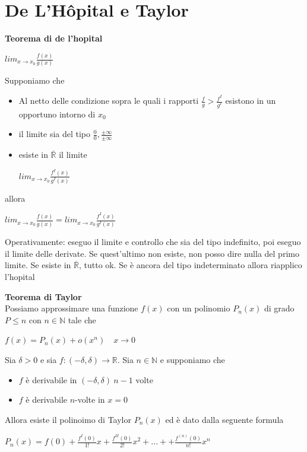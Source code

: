 \documentclass[12pt, a4paper]{article}
\begin{document}
    \section{De L'Hôpital e Taylor}
    \textbf{Teorema di de l'hopital}
    \begin{center}
        $lim_{x\to x_{0}}\frac{f(x)}{g(x)}$
    \end{center}
    Supponiamo che
    \begin{itemize}
        \item Al netto delle condizione sopra le quali i rapporti $\frac{f}{g}>\frac{f^{I}}{g^{I}}$ esistono in un
              opportuno intorno di $x_{0}$
        \item il limite sia del tipo $\frac{0}{0},\frac{\pm\infty}{\pm\infty}$
        \item esiste in $\overline{\mathbb{R}}$ il limite
              \begin{center}
                  $lim_{x\to x_{0}}\frac{f^{I}(x)}{g^{I}(x)}$
              \end{center}
    \end{itemize}
    allora
    \begin{center}
        $lim_{x\to x_{0}}\frac{f(x)}{g(x)}=lim_{x\to x_{0}}\frac{f^{I}(x)}{g^{I}(x)}$
    \end{center}

    Operativamente: eseguo il limite e controllo che sia del tipo indefinito, poi eseguo il limite delle derivate. Se
    quest'ultimo non esiste, non posso dire nulla del primo limite. Se esiste in $\overline{\mathbb{R}}$, tutto ok.
    Se è ancora del tipo indeterminato allora riapplico l'hopital

    \textbf{Teorema di Taylor}\\Possiamo approssimare una funzione $f(x)$ con un polinomio $P_{n}(x)$ di grado $P\leq n$
    con $n\in\mathbb{N}$ tale che
    \begin{center}
        $f(x)=P_{n}(x)+o(x^{n})\quad x\to 0$
    \end{center}

    Sia $\delta>0$ e sia $f:(-\delta,\delta)\to \mathbb{R}$. Sia $n\in\mathbb{N}$ e supponiamo che
    \begin{itemize}
        \item $f$ è derivabile in $(-\delta,\delta)\ n-1$ volte
        \item $f$ è derivabile $n$-volte in $x=0$
    \end{itemize}
    Allora esiste il polinoimo di Taylor $P_{n}(x)$ ed è dato dalla seguente formula
    \begin{center}
        $P_{n}(x)=f(0)+\frac{f^{I}(0)}{1!}x+\frac{f^{II}(0)}{2!}x^{2}+...++\frac{f^{(n)}(0)}{n!}x^{n}$
    \end{center}
\end{document}
